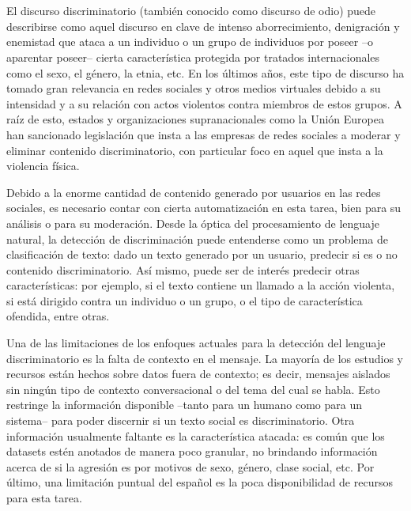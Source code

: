 \chapter*{\runtitulo}

{


\noindent El discurso discriminatorio (también conocido como discurso de odio) puede describirse como aquel discurso en clave de intenso aborrecimiento, denigración y enemistad que ataca a un individuo o un grupo de individuos por poseer –o aparentar poseer– cierta característica protegida por tratados internacionales como el sexo, el género, la etnia, etc. En los últimos años, este tipo de discurso ha tomado gran relevancia en redes sociales y otros medios virtuales debido a su intensidad y a su relación con actos violentos contra miembros de estos grupos. A raíz de esto, estados y organizaciones supranacionales como la Unión Europea han sancionado legislación que insta a las empresas de redes sociales a moderar y eliminar contenido discriminatorio, con particular foco en aquel que insta a la violencia física.

Debido a la enorme cantidad de contenido generado por usuarios en las redes sociales, es necesario contar con cierta automatización en esta tarea, bien para su análisis o para su moderación. Desde la óptica del procesamiento de lenguaje natural, la detección de discriminación puede entenderse como un problema de clasificación de texto: dado un texto generado por un usuario, predecir si es o no contenido discriminatorio. Así mismo, puede ser de interés predecir otras características: por ejemplo, si el texto contiene un llamado a la acción violenta, si está dirigido contra un individuo o un grupo, o el tipo de característica ofendida, entre otras.

Una de las limitaciones de los enfoques actuales para la detección del lenguaje discriminatorio es la falta de contexto en el mensaje. La mayoría de los estudios y recursos están hechos sobre datos fuera de contexto; es decir, mensajes aislados sin ningún tipo de contexto conversacional o del tema del cual se habla. Esto restringe la información disponible –tanto para un humano como para un sistema– para poder discernir si un texto social es discriminatorio. Otra información usualmente faltante es la característica atacada: es común que los datasets estén anotados de manera poco granular, no brindando información acerca de si la agresión es por motivos de sexo, género, clase social, etc. Por último, una limitación puntual del español es la poca disponibilidad de recursos para esta tarea.

}
